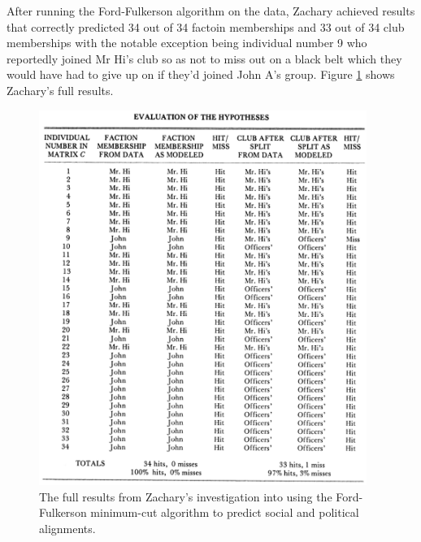 After running the Ford-Fulkerson algorithm on the data, Zachary achieved results that correctly predicted 34 out of 34 factoin memberships and 33 out of 34 club memberships with the notable exception being individual number 9 who reportedly joined Mr Hi's club so as not to miss out on a black belt which they would have had to give up on if they'd joined John A's group. Figure \ref{fig:zachary_results} shows Zachary's full results.

\begin{figure}
    \begin{center}
        \includegraphics[width=0.95\textwidth]{img/zachary_results}
    \end{center}
    \caption{The full results from Zachary's investigation into using the Ford-Fulkerson minimum-cut algorithm to predict social and political alignments.\cite{konect:ucidata-zachary}}
    \label{fig:zachary_results}
\end{figure}


